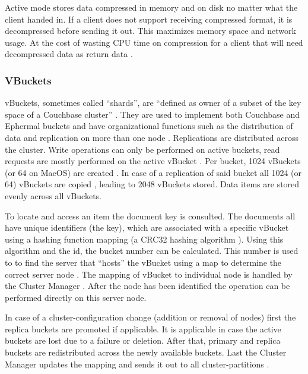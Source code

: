 Active mode stores data compressed in memory and on disk no matter what the client handed in. If a client does not support receiving compressed format, it is decompressed before sending it out. This maximizes memory space and network usage. At the cost of wasting CPU time on compression for a client that will need decompressed data as return data \parencite{couchbaseDocuCompression}.
\subsubsection{VBuckets}
vBuckets, sometimes called \enquote{shards}, are \enquote{defined as owner of a subset of the key space of a Couchbase cluster} \parencite{objelean} \parencite{couchbaseDocuVbuckets}. They are used to implement both Couchbase and Ephermal buckets \parencite{couchbaseDocuVbuckets} and have organizational functions such as the distribution of data and replication on more than one node \parencite{objelean} \parencite{couchbaseDocuVbuckets}. Replications are distributed across the cluster. Write operations can only be performed on active buckets, read requests are mostly performed on the active vBucket \parencite{couchbaseDocuVbuckets}. Per bucket, 1024 vBuckets (or 64 on MacOS) are created \parencite{couchbaseDocuVbuckets}. In case of a replication of said bucket all 1024 (or 64) vBuckets are copied \parencite{couchbaseDocuVbuckets}, leading to 2048 vBuckets stored.  Data items are stored evenly across all vBuckets.

To locate and access an item the document key is consulted. The documents all have unique identifiers (the key), which are associated with a specific vBucket using a hashing function mapping \parencite{objelean} (a CRC32 hashing algorithm \parencite{couchbaseDocuVbuckets}). Using this algorithm and the id, the bucket number can be calculated. This number is used to to find the server that \enquote{hosts} the vBucket using a map to determine the correct server node \parencite{couchbaseDocuVbuckets}. The mapping of vBucket to individual node is handled by the Cluster Manager \parencite{couchbaseDocuVbuckets}. After the node has been identified the operation can be performed directly on this server node.

In case of a cluster-configuration change (addition or removal of nodes) first the replica buckets are promoted if applicable. It is applicable in case the active buckets are lost due to a failure or deletion. After that, primary and replica buckets are redistributed across the newly available buckets. Last the Cluster Manager updates the mapping and sends it out to all cluster-partitions \parencite{couchbaseDocuVbuckets}.

